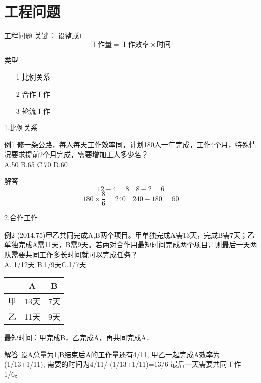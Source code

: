 \documentclass[10pt]{beamer}
\begin{document}
\section{工程问题}
\begin{frame}{工程问题}
关键： 设整或$1$
\[\mbox{工作量}=\mbox{工作效率}\times \mbox{时间}\]
 \begin{block}{类型}
  \begin{itemize}
    \item[1] 比例关系
    \item[2] 合作工作
    \item[3] 轮流工作 
  \end{itemize}
\end{block} 


\end{frame}
\begin{frame}{1.比例关系}
\begin{block}{例1}
  修一条公路，每人每天工作效率同，计划180人一年完成，工作4个月，特殊情况要求提前2个月完成，需要增加工人多少名？\\
  A.50\quad
  B.65\quad
  C.70\quad
  {\color{red}D.60}
\end{block}
\begin{alertblock}{解答}
  \[12-4=8 \quad   8-2=6\]
$$180\times \frac{8}{6}=240 \quad 240-180=60$$
\end{alertblock}
\end{frame}
\begin{frame}{2.合作工作}
\begin{block}{例2}
  (2014.75)甲乙共同完成A,B两个项目。甲单独完成A需13天，完成B需7天；乙单独完成A需11天，B需9天。若两对合作用最短时间完成两个项目，则最后一天两队需要共同工作多长时间就可以完成任务？\\
  A. 1/12天 \quad   B.1/9天\quad     C.1/7天
\end{block}
\begin{center}
  \begin{tabular}{c|c|c}
 & A&B\\
 \hline
 甲&13天&7天\\
 乙&11天&9天
\end{tabular}
\end{center}

最短时间：甲完成B，乙完成A，再共同完成A．
\begin{alertblock}{解答}
设A总量为1,B结束后A的工作量还有4/11, 甲乙一起完成A效率为(1/13+1/11),
需要的时间为4/11/ (1/13+1/11)=13/6 最后一天需要共同工作1/6。
\end{alertblock}
\end{frame}
\end{document}
